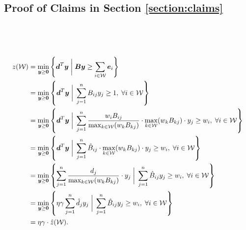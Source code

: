 \documentclass[moor]{informs1}              %
\newcommand{\mb}[1]{\ensuremath{\boldsymbol{#1}}}
\begin{document}
\begin{APPENDICES}

\section{Proof of Claims in Section \ref{section:claims}} \label{appendix:lem:structural-resulto}
\

\

\begin{align*}
z({\cal W})   &= \min_{\mb y \geq \mb 0} \left\{ \mb d^T \mb y \; \bigg\vert \; \mb B \mb y \geq \sum_{ i \in {\cal W}} \mb e_i  \right\} \\
&= \min_{\mb y \geq \mb 0 } \left\{ \mb d^T \mb y \; \bigg\vert \; \sum_{j=1}^n B_{ij} y_j \geq 1, \; \forall i \in {\cal W} \right\} \\
&= \min_{\mb y \geq \mb 0 } \left\{ \mb d^T \mb y \; \bigg\vert \; \sum_{j=1}^n  \frac{w_i B_{ij}}{ \max_{k\in {\cal W}} (w_k B_{kj})} \cdot   \max_{k \in {\cal W}} (w_k B_{kj}) \cdot y_j \geq w_i, \; \forall i \in {\cal W} \right\} \\
&= \min_{\mb y \geq \mb 0 } \left\{ \mb d^T \mb y \; \bigg\vert \; \sum_{j=1}^n \hat{B}_{ij} \cdot \max_{k \in {\cal W}}  (w_k B_{kj}) \cdot  y_j\geq w_i, \; \forall i \in {\cal W} \right\} \\
&= \min_{\mb y \geq \mb 0 } \left\{ \sum_{j=1}^n  \frac{d_j}{\max_{k \in {\cal W}} (w_k B_{kj})} \cdot  y_j  \; \bigg\vert \; \sum_{j=1}^n \hat{B}_{ij}   y_j\geq w_i, \; \forall i \in {\cal W} \right\} \\
&=  \min_{\mb y \geq \mb 0 } \left\{ \eta \gamma \sum_{j=1}^n  \hat{d}_j y_j  \; \bigg\vert \; \sum_{j=1}^n \hat{B}_{ij}   y_j\geq w_i, \; \forall i \in {\cal W} \right\} \\
&= \eta \gamma \cdot    \hat z({\cal W})  .
\end{align*}
\hfill
\Halmos
\endproof

\vspace{2mm}


\end{APPENDICES}
\end{document}
